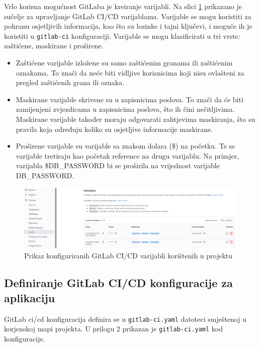 \documentclass[a4paper,12pt,oneside]{article}
\begin{document}
Vrlo korisna mogućnost GitLaba je kreiranje varijabli. Na slici \ref{fig:git-variables} prikazano je sučelje za upravljanje GitLab CI/CD varijablama. Varijable se mogu koristiti za pohranu osjetljivih informacija, kao što su lozinke i tajni ključevi, i moguće ih je koristiti u \texttt{gitlab-ci} konfiguraciji. Varijable se mogu klasificirati u tri vrste: zaštićene, maskirane i proširene.
\begin{itemize}
    \item Zaštićene varijable izložene su samo zaštićenim granama ili zaštićenim oznakama. To znači da neće biti vidljive korisnicima koji nisu ovlašteni za pregled zaštićenih grana ili oznaka.
    \item Maskirane varijable skrivene su u zapisnicima poslova. To znači da će biti zamijenjeni zvjezdicama u zapisnicima poslova, što ih čini nečitljivima. Maskirane varijable također moraju odgovarati zahtjevima maskiranja, što su pravila koja određuju koliko su osjetljive informacije maskirane.
    \item Proširene varijable su varijable sa znakom dolara (\$) na početku. Te se varijable tretiraju kao početak reference na drugu varijablu. Na primjer, varijabla \$DB\_PASSWORD bi se proširila na vrijednost varijable DB\_PASSWORD.
\end{itemize}


\begin{figure}
    \centering
    \includegraphics[width=1\linewidth]{Slike/gitlab-variables.png}
    \caption{Prikaz konfiguriranih GitLab CI/CD varijabli korištenih u projektu}
    \label{fig:git-variables}
\end{figure}

\subsection{Definiranje GitLab CI/CD konfiguracije za aplikaciju}

GitLab ci/cd konfiguracija definira se u \texttt{gitlab-ci.yaml} datoteci smještenoj u korjenskoj mapi projekta. U prilogu 2 prikazan je \texttt{gitlab-ci.yaml} kod konfiguracije.
\end{document}
